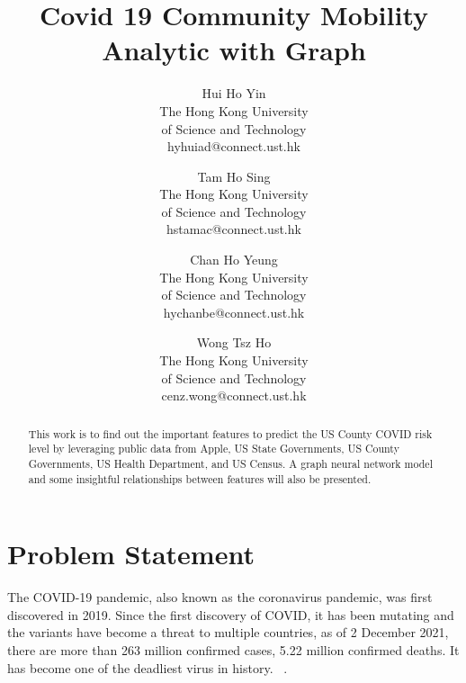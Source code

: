 

\date{}

\title{\Large \bf Covid 19 Community Mobility Analytic with Graph
}

\author{
{\rm Hui Ho Yin}\\
The Hong Kong University\\
of Science and Technology\\
hyhuiad@connect.ust.hk
\and
{\rm Tam Ho Sing}\\
The Hong Kong University\\
of Science and Technology\\
hstamac@connect.ust.hk
\and
{\rm Chan Ho Yeung}\\
The Hong Kong University\\
of Science and Technology\\
hychanbe@connect.ust.hk
\and
{\rm Wong Tsz Ho}\\
The Hong Kong University\\
of Science and Technology\\
cenz.wong@connect.ust.hk
} %

\maketitle

\begin{abstract}
This work is to find out the important features to predict the US County COVID risk level by leveraging public data from Apple, US State Governments, US County Governments, US Health Department, and US Census. A graph neural network model and some insightful relationships between features will also be presented.
\end{abstract}


\section{Problem Statement}
The COVID-19 pandemic, also known as the coronavirus pandemic, was first discovered in 2019. Since the first discovery of COVID, it has been mutating and the variants have become a threat to multiple countries, as of 2 December 2021, there are more than 263 million confirmed cases, 5.22 million confirmed deaths. It has become one of the deadliest virus in history.  ~\cite{coviddata}. \\


